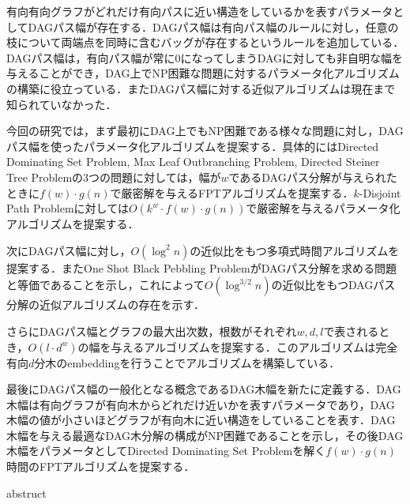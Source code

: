 \documentclass[master]{kuisthesis}		%
\theoremstyle{plain}
\theoremstyle{definition}
\begin{document}
\begin{jabstract}
有向有向グラフがどれだけ有向パスに近い構造をしているかを表すパラメータとしてDAGパス幅が存在する．DAGパス幅は有向パス幅のルールに対し，任意の枝について両端点を同時に含むバッグが存在するというルールを追加している．DAGパス幅は，有向パス幅が常に0になってしまうDAGに対しても非自明な幅を与えることができ，DAG上でNP困難な問題に対するパラメータ化アルゴリズムの構築に役立っている．またDAGパス幅に対する近似アルゴリズムは現在まで知られていなかった．


今回の研究では，まず最初にDAG上でもNP困難である様々な問題に対し，DAGパス幅を使ったパラメータ化アルゴリズムを提案する．具体的にはDirected Dominating Set Problem, Max Leaf Outbranching Problem, Directed Steiner Tree Problemの3つの問題に対しては，幅が$w$であるDAGパス分解が与えられたときに$f(w)\cdot g(n)$で厳密解を与えるFPTアルゴリズムを提案する．$k$-Disjoint Path Problemに対しては$O(k^w\cdot f(w)\cdot g(n))$で厳密解を与えるパラメータ化アルゴリズムを提案する．

次にDAGパス幅に対し，$O(\log^2 n)$の近似比をもつ多項式時間アルゴリズムを提案する．またOne Shot Black Pebbling ProblemがDAGパス分解を求める問題と等価であることを示し，これによって$O(\log^{3/2} n)$の近似比をもつDAGパス分解の近似アルゴリズムの存在を示す．

さらにDAGパス幅とグラフの最大出次数，根数がそれぞれ$w, d, l$で表されるとき，$O(l\cdot d^w)$の幅を与えるアルゴリズムを提案する．このアルゴリズムは完全有向$d$分木のembeddingを行うことでアルゴリズムを構築している．


最後にDAGパス幅の一般化となる概念であるDAG木幅を新たに定義する．DAG木幅は有向グラフが有向木からどれだけ近いかを表すパラメータであり，DAG木幅の値が小さいほどグラフが有向木に近い構造をしていることを表す．DAG木幅を与える最適なDAG木分解の構成がNP困難であることを示し，その後DAG木幅をパラメータとしてDirected Dominating Set Problemを解く$f(w)\cdot g(n)$時間のFPTアルゴリズムを提案する．

\end{jabstract}











\begin{eabstract}				%
abstruct
\end{eabstract}
\end{document}
